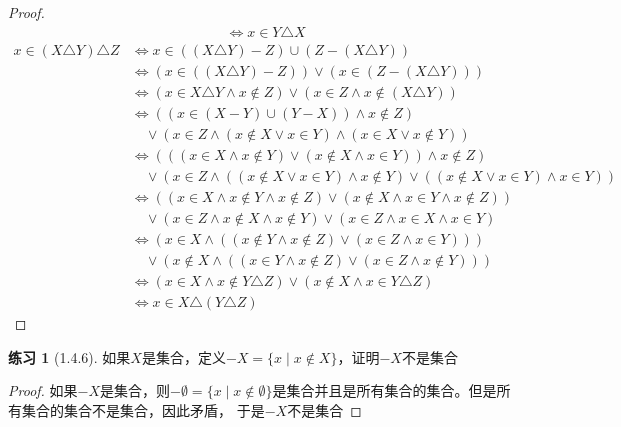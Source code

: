 \documentclass[11pt]{article}
\theoremstyle{definition}
\newtheorem{exercise}{练习}
\begin{document}
\begin{proof}
\begin{align*}
&\Leftrightarrow x\in Y\triangle X
\end{align*}
\begin{align*}
x\in(X\triangle Y)\triangle Z&\Leftrightarrow x\in((X\triangle Y)-Z)\cup(Z-(X\triangle Y))\\
&\Leftrightarrow (x\in ((X\triangle Y)-Z))\vee(x\in(Z-(X\triangle Y)))\\
&\Leftrightarrow (x\in X\triangle Y\wedge x\notin Z)\vee(x\in Z\wedge x\notin(X\triangle Y))\\
&\Leftrightarrow ((x\in (X-Y)\cup(Y-X))\wedge x\notin Z)\\&\quad\vee(x\in Z\wedge (x\notin X\vee x\in Y)\wedge(x\in X\vee x\notin Y))\\
&\Leftrightarrow (((x\in X\wedge x\notin Y)\vee(x\notin X\wedge x\in Y))\wedge x\notin Z)\\&\quad\vee
(x\in Z\wedge ((x\notin X\vee x\in Y)\wedge x\notin Y)\vee((x\notin X\vee x\in Y)\wedge x\in Y))\\
&\Leftrightarrow ((x\in X\wedge x\notin Y\wedge x\notin Z)\vee(x\notin X\wedge x\in Y\wedge x\notin Z))\\&\quad\vee(x\in Z\wedge x\notin X\wedge x\notin Y)\vee(x\in Z\wedge x\in X\wedge x\in Y)\\
&\Leftrightarrow (x\in X\wedge((x\notin Y\wedge x\notin Z)\vee(x\in Z\wedge x\in Y)))\\&\quad\vee(x\notin X\wedge((x\in Y\wedge x\notin Z)\vee(x\in Z\wedge x\notin Y)))\\
&\Leftrightarrow (x\in X\wedge x\notin Y\triangle Z)\vee(x\notin X\wedge x\in Y\triangle Z)\\
&\Leftrightarrow x\in X\triangle(Y\triangle Z)
\end{align*}
\end{proof}

\begin{exercise}[1.4.6]
如果\(X\)是集合，定义\(-X=\{x\mid x\notin X\}\)，证明\(-X\)不是集合
\end{exercise}

\begin{proof}
如果\(-X\)是集合，则\(-\emptyset=\{x\mid x\notin\emptyset\}\)是集合并且是所有集合的集合。但是所有集合的集合不是集合，因此矛盾，
于是\(-X\)不是集合
\end{proof}
\end{document}
